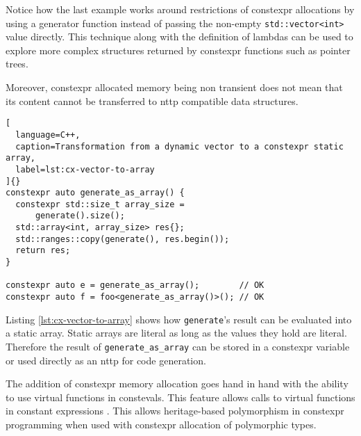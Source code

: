 \documentclass[../main]{subfiles}
\begin{document}
Notice how the last example works around restrictions of \gls{constexpr} allocations
by using a generator function instead of passing the non-empty
\lstinline{std::vector<int>} value directly. This technique along with the
definition of lambdas can be used to explore more complex structures returned by
\gls{constexpr} functions such as pointer trees.

Moreover, \gls{constexpr} allocated memory being non transient does not mean that its
content cannot be transferred to \gls{nttp} compatible data structures.

\begin{lstlisting}[
  language=C++,
  caption=Transformation from a dynamic vector to a constexpr static array,
  label=lst:cx-vector-to-array
]{}
constexpr auto generate_as_array() {
  constexpr std::size_t array_size =
      generate().size();
  std::array<int, array_size> res{};
  std::ranges::copy(generate(), res.begin());
  return res;
}

constexpr auto e = generate_as_array();        // OK
constexpr auto f = foo<generate_as_array()>(); // OK
\end{lstlisting}

Listing \ref{lst:cx-vector-to-array} shows how \lstinline{generate}'s result
can be evaluated into a static array. Static arrays are literal as long
as the values they hold are literal. Therefore the result of
\lstinline{generate_as_array} can be stored in a \gls{constexpr} variable or
used directly as an \gls{nttp} for code generation.

The addition of \gls{constexpr} memory allocation goes hand in hand
with the ability to use virtual functions in \glspl{consteval}.
This feature allows calls to virtual functions in constant expressions
\cite{virtual-constexpr}. This allows heritage-based polymorphism in
\gls{constexpr} programming when used with \gls{constexpr} allocation of
polymorphic types.


%
\end{document}
